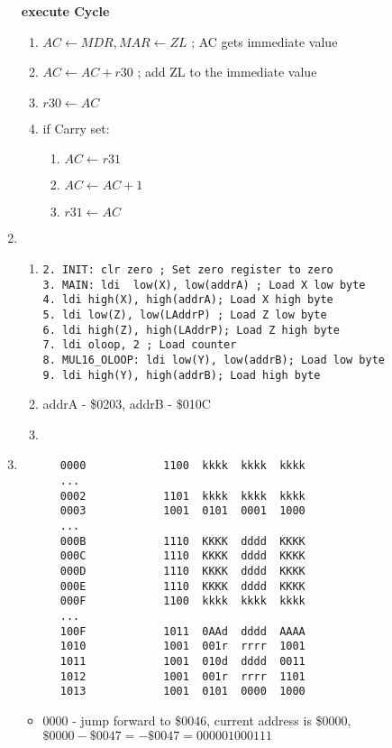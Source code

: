 \documentclass{article}
\begin{document}
\begin{enumerate}
      \textbf{execute Cycle}\begin{enumerate}
        \item $AC \leftarrow MDR, MAR \leftarrow ZL$ ; AC gets immediate value
        \item $AC \leftarrow AC + r30$ ; add ZL to the immediate value
        \item $r30 \leftarrow AC$
        \item if Carry set:\begin{enumerate}
          \item $AC \leftarrow r31$
          \item $AC \leftarrow AC + 1$
          \item $r31 \leftarrow AC$
          \end{enumerate}
        \end{enumerate}
    \item\begin{enumerate}
      \item\begin{verbatim}
2. INIT: clr zero ; Set zero register to zero
3. MAIN: ldi  low(X), low(addrA) ; Load X low byte
4. ldi high(X), high(addrA); Load X high byte
5. ldi low(Z), low(LAddrP) ; Load Z low byte
6. ldi high(Z), high(LAddrP); Load Z high byte
7. ldi oloop, 2 ; Load counter
8. MUL16_OLOOP: ldi low(Y), low(addrB); Load low byte
9. ldi high(Y), high(addrB); Load high byte
        \end{verbatim}
      \item addrA - \$0203, addrB - \$010C
      \item 
      \end{enumerate}
    \item\begin{verbatim}
      0000            1100  kkkk  kkkk  kkkk
      ...
      0002            1101  kkkk  kkkk  kkkk
      0003            1001  0101  0001  1000
      ...
      000B            1110  KKKK  dddd  KKKK
      000C            1110  KKKK  dddd  KKKK
      000D            1110  KKKK  dddd  KKKK
      000E            1110  KKKK  dddd  KKKK
      000F            1100  kkkk  kkkk  kkkk
      ...
      100F            1011  0AAd  dddd  AAAA
      1010            1001  001r  rrrr  1001
      1011            1001  010d  dddd  0011
      1012            1001  001r  rrrr  1101
      1013            1001  0101  0000  1000
      \end{verbatim}
      \begin{itemize}
        \item 0000 - jump forward to \$0046, current address is \$0000, $\$0000 - \$0047 = -\$0047 = 0000 0100 0111$

\end{itemize}
\end{enumerate}
\end{document}
